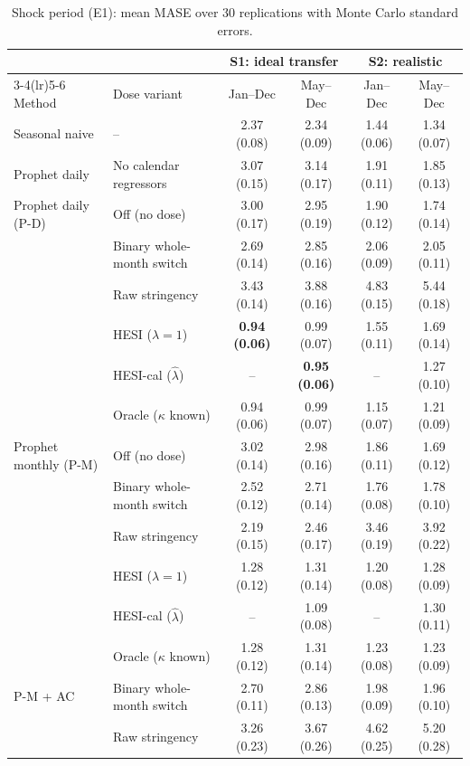 \documentclass{article}
\theoremstyle{plain}
\theoremstyle{definition}
\theoremstyle{remark}
\begin{document}
\begin{table}[h]
\centering
\caption{Shock period (E1): mean MASE over 30 replications with Monte Carlo standard errors.}
\label{tab:e1mase}
\scriptsize
\setlength{\tabcolsep}{4pt}
\begin{tabular}{llcccc}
\toprule
 & & \multicolumn{2}{c}{S1: ideal transfer} & \multicolumn{2}{c}{S2: realistic} \\
\cmidrule(lr){3-4}\cmidrule(lr){5-6}
Method & Dose variant & Jan--Dec & May--Dec & Jan--Dec & May--Dec \\
\midrule
Seasonal naive & -- & 2.37 (0.08) & 2.34 (0.09) & 1.44 (0.06) & 1.34 (0.07) \\
\addlinespace
Prophet daily & No calendar regressors & 3.07 (0.15) & 3.14 (0.17) & 1.91 (0.11) & 1.85 (0.13) \\
\addlinespace
Prophet daily (P-D) & Off (no dose) & 3.00 (0.17) & 2.95 (0.19) & 1.90 (0.12) & 1.74 (0.14) \\
 & Binary whole-month switch & 2.69 (0.14) & 2.85 (0.16) & 2.06 (0.09) & 2.05 (0.11) \\
 & Raw stringency & 3.43 (0.14) & 3.88 (0.16) & 4.83 (0.15) & 5.44 (0.18) \\
 & HESI ($\lambda=1$) & \textbf{0.94 (0.06)} & 0.99 (0.07) & 1.55 (0.11) & 1.69 (0.14) \\
 & HESI-cal ($\hat\lambda$) & -- & \textbf{0.95 (0.06)} & -- & 1.27 (0.10) \\
 & Oracle ($\kappa$ known) & 0.94 (0.06) & 0.99 (0.07) & 1.15 (0.07) & 1.21 (0.09) \\
\addlinespace
Prophet monthly (P-M) & Off (no dose) & 3.02 (0.14) & 2.98 (0.16) & 1.86 (0.11) & 1.69 (0.12) \\
 & Binary whole-month switch & 2.52 (0.12) & 2.71 (0.14) & 1.76 (0.08) & 1.78 (0.10) \\
 & Raw stringency & 2.19 (0.15) & 2.46 (0.17) & 3.46 (0.19) & 3.92 (0.22) \\
 & HESI ($\lambda=1$) & 1.28 (0.12) & 1.31 (0.14) & 1.20 (0.08) & 1.28 (0.09) \\
 & HESI-cal ($\hat\lambda$) & -- & 1.09 (0.08) & -- & 1.30 (0.11) \\
 & Oracle ($\kappa$ known) & 1.28 (0.12) & 1.31 (0.14) & 1.23 (0.08) & 1.23 (0.09) \\
\addlinespace
P-M + AC & Binary whole-month switch & 2.70 (0.11) & 2.86 (0.13) & 1.98 (0.09) & 1.96 (0.10) \\
 & Raw stringency & 3.26 (0.23) & 3.67 (0.26) & 4.62 (0.25) & 5.20 (0.28) \\

\end{tabular}
\end{table}
\end{document}
